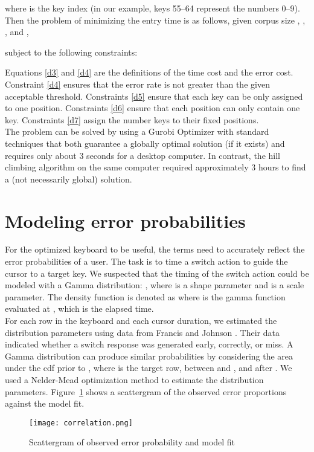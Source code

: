 \documentclass{sig-alternate}
\begin{document}
where  is the key index (in our example, keys 55--64 represent the numbers 0--9).  Then 
the problem of minimizing the entry time is as follows, given corpus size , , , and , 

subject to the following constraints:

Equations \eqref{d3} and \eqref{d4} are the definitions of the time cost and the error cost. Constraint \eqref{d4}
ensures that the error rate is not greater than the given acceptable threshold. Constraints
\eqref{d5} ensure that each key can be only assigned to one position. Constraints \eqref{d6} ensure that each position
can only contain one key. Constraints \eqref{d7} assign the number keys to their fixed positions.\\
The problem can be solved by using a Gurobi Optimizer with standard techniques that both guarantee a globally optimal solution (if it exists) and requires only about 3 seconds for a desktop computer. In contrast, the hill climbing algorithm on the same computer required approximately 3 hours to find a (not necessarily global) solution.\\
\section{Modeling error probabilities}
For the optimized keyboard to be useful, the  terms need to accurately reflect the error probabilities of a user.  The task is to time a switch action to guide the cursor to a target key. We suspected that the timing of the switch action could be modeled with a Gamma distribution: , where  is a shape parameter and  is a scale parameter. The density function is denoted as  where  is the gamma function evaluated at , which is the elapsed time.\\
For each row in the keyboard and each cursor duration, we estimated the distribution parameters using data from Francis and Johnson \cite{Francis2011}. Their data indicated whether a switch response was generated early, correctly, or miss. A  Gamma distribution can produce similar probabilities by considering the area under the cdf prior to , where  is the target row, between  and , and after . We used a Nelder-Mead optimization method to estimate the distribution parameters. Figure~\ref{cor} shows a scattergram of the observed error proportions against the model fit. 
\begin{figure}[htb!]
		\centering
		\texttt{[image: correlation.png]}\\
		\caption{Scattergram of observed error probability and model fit}
		\label{cor}
\end{figure}
\end{document}
